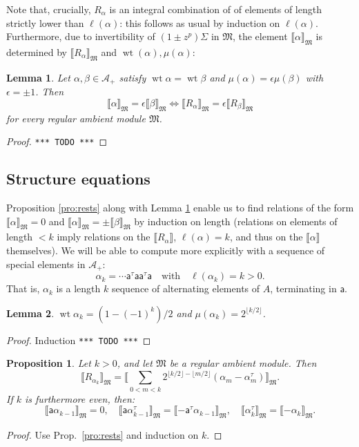 \documentclass{article}
\def\MISS{\texttt{*** TODO ***}}
\def\llb{\llbracket}
\def\rrb{\rrbracket}
\def\fM{\mathfrak{M}}
\def\sA{\mathscr{A}}
\def\inv{\tau} %
\DeclareMathOperator{\wt}{\mathrm{wt}}
\def\a{\mathsf{a}}
\def\R{R}
\newtheorem{lem}{Lemma}
\newtheorem{prop}{Proposition}
\theoremstyle{definition}
\begin{document}
Note that, crucially, $R_\alpha$ is an integral combination of
of elements of length strictly lower than $\ell(\alpha)$: this
follows as usual by induction on $\ell(\alpha)$. 
Furthermore, due to invertibility of
$(1 \pm z^p)\Sigma$ in $\fM$, 
the element
$\llb\alpha\rrb_\fM$ is determined by
$\llb R_\alpha\rrb_\fM$ and $\wt(\alpha),\mu(\alpha)$:
\begin{lem}\label{lem:rinj}
        Let $\alpha,\beta\in\sA_+$
        satisfy $\wt\alpha=\wt\beta$
        and $\mu(\alpha) = \epsilon \mu(\beta)$
        with $\epsilon = \pm1$.
        Then
        $$
        \llb \alpha\rrb_\fM = \epsilon \llb \beta\rrb_\fM
        \iff
        \llb \R_\alpha \rrb_\fM = \epsilon \llb \R_\beta\rrb_\fM 
        $$
        for every regular ambient module $\fM$.
\end{lem}
\begin{proof}\MISS
\end{proof}

\subsection{Structure equations}

Proposition \ref{pro:rests} along with Lemma \ref{lem:rinj}
enable us to find relations of the form
$\llb\alpha\rrb_\fM=0$ and $\llb \alpha\rrb_\fM = \pm\llb\beta\rrb_\fM$
by induction on length (relations
on elements of length $<k$  imply relations on the
$\llb R_\alpha\rrb$, $\ell(\alpha)=k$,
and thus on the $\llb \alpha\rrb$ themselves).
We will be able to compute more explicitly with a sequence of special elements in $\sA_+$:
$$ \alpha_k = \cdots \a^\inv \a \a^\inv\a\quad\textrm{with}\quad \ell(\alpha_k)=k > 0. $$
That is, $\alpha_k$ is a length $k$ sequence of alternating elements of $A$,
terminating in $\a$.
\begin{lem}
        $\wt\alpha_k = (1 - (-1)^k)/2$ and $\mu(\alpha_k) = 2^{\lfloor k/2\rfloor}$.
\end{lem}
\begin{proof}Induction \MISS \end{proof}
\begin{prop}
        Let $k>0$, and let $\fM$ be a regular ambient module.
        Then
        $$
         \llb \R_{\alpha_k}\rrb_\fM = \llb \sum_{0<m<k} 2^{\lfloor k/2\rfloor - \lfloor m/2\rfloor} (\alpha_m
         - \alpha_m^\inv) \rrb_\fM.
        $$
        If $k$ is furthermore even, then:
        $$\llb \a \alpha_{k-1}\rrb_\fM=0,\quad
        \llb \a \alpha_{k-1}^\inv \rrb_\fM = \llb -\a^\inv \alpha_{k-1}\rrb_\fM,\quad
        \llb \alpha_k^\inv\rrb_\fM = \llb -\alpha_k\rrb_\fM.$$
\end{prop}
\begin{proof}
        Use Prop.~\ref{pro:rests} and induction on $k$.
\end{proof}
\end{document}
